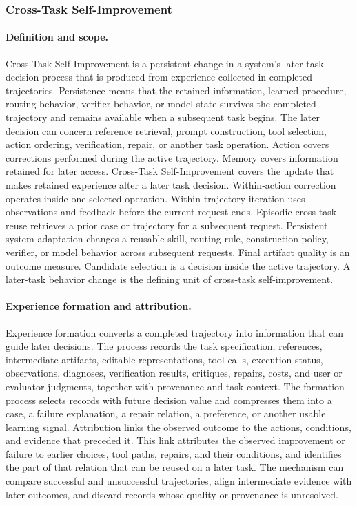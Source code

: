\subsubsection{Cross-Task Self-Improvement}

\paragraph{Definition and scope.}
Cross-Task Self-Improvement is a persistent change in a system's later-task decision process that is produced from experience collected in completed trajectories. Persistence means that the retained information, learned procedure, routing behavior, verifier behavior, or model state survives the completed trajectory and remains available when a subsequent task begins. The later decision can concern reference retrieval, prompt construction, tool selection, action ordering, verification, repair, or another task operation. Action covers corrections performed during the active trajectory. Memory covers information retained for later access. Cross-Task Self-Improvement covers the update that makes retained experience alter a later task decision. Within-action correction operates inside one selected operation. Within-trajectory iteration uses observations and feedback before the current request ends. Episodic cross-task reuse retrieves a prior case or trajectory for a subsequent request. Persistent system adaptation changes a reusable skill, routing rule, construction policy, verifier, or model behavior across subsequent requests. Final artifact quality is an outcome measure. Candidate selection is a decision inside the active trajectory. A later-task behavior change is the defining unit of cross-task self-improvement.

\paragraph{Experience formation and attribution.}
Experience formation converts a completed trajectory into information that can guide later decisions. The process records the task specification, references, intermediate artifacts, editable representations, tool calls, execution status, observations, diagnoses, verification results, critiques, repairs, costs, and user or evaluator judgments, together with provenance and task context. The formation process selects records with future decision value and compresses them into a case, a failure explanation, a repair relation, a preference, or another usable learning signal. Attribution links the observed outcome to the actions, conditions, and evidence that preceded it. This link attributes the observed improvement or failure to earlier choices, tool paths, repairs, and their conditions, and identifies the part of that relation that can be reused on a later task. The mechanism can compare successful and unsuccessful trajectories, align intermediate evidence with later outcomes, and discard records whose quality or provenance is unresolved.

